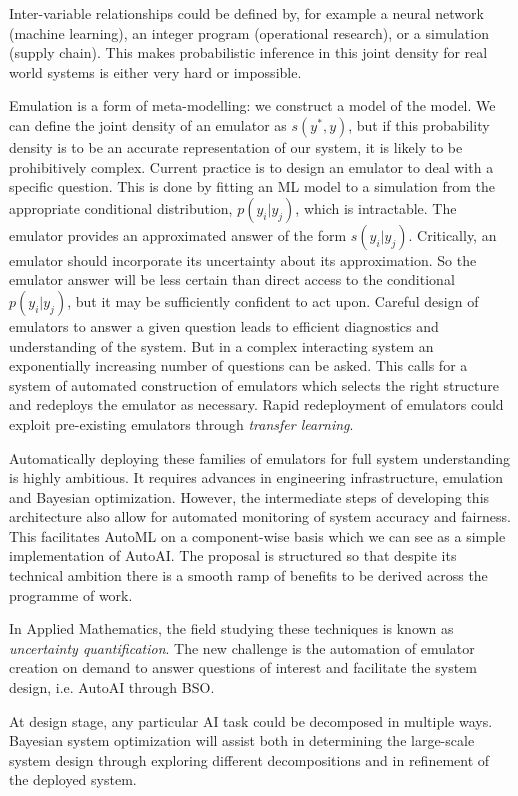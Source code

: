 \documentclass[a4paper]{caesar_book}
\begin{document}
Inter-variable relationships could be defined by, for example a neural network (machine learning), an integer program (operational research), or a simulation (supply chain). This makes probabilistic inference in this joint density for real world systems is either very hard or impossible.

Emulation is a form of meta-modelling: we construct a model of the model. We can define the joint density of an emulator as $s(y^{*},y)$, but if this probability density is to be an accurate representation of our system, it is likely to be prohibitively complex. Current practice is to design an emulator to deal with a specific question. This is done by fitting an ML model to a simulation from the appropriate conditional distribution, $p(y_i|y_j)$, which is intractable. The emulator provides an approximated answer of the form $s(y_i|y_j)$. Critically, an emulator should incorporate its uncertainty about its approximation. So the emulator answer will be less certain than direct access to the conditional $p(y_i|y_j)$, but it may be sufficiently confident to act upon. Careful design of emulators to answer a given question leads to efficient diagnostics and understanding of the system. But in a complex interacting system an exponentially increasing number of questions can be asked. This calls for a system of automated construction of emulators which selects the right structure and redeploys the emulator as necessary. Rapid redeployment of emulators could exploit pre-existing emulators through \textit{transfer learning}.

Automatically deploying these families of emulators for full system understanding is highly ambitious. It requires advances in engineering infrastructure, emulation and Bayesian optimization. However, the intermediate steps of developing this architecture also allow for automated monitoring of system accuracy and fairness. This facilitates AutoML on a component-wise basis which we can see as a simple implementation of AutoAI. The proposal is structured so that despite its technical ambition there is a smooth ramp of benefits to be derived across the programme of work.

In Applied Mathematics, the field studying these techniques is known as \textit{uncertainty quantification}. The new challenge is the automation of emulator creation on demand to answer questions of interest and facilitate the system design, i.e. AutoAI through BSO.

At design stage, any particular AI task could be decomposed in multiple ways. Bayesian system optimization will assist both in determining the large-scale system design through exploring different decompositions and in refinement of the deployed system.
\end{document}
